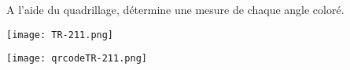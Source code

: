 
A l'aide du quadrillage, détermine une mesure de chaque angle coloré. 

\begin{minipage}{0.48\linewidth}
\texttt{[image: TR-211.png]} 
\end{minipage}
\hfill
\begin{minipage}{0.48\linewidth}
\texttt{[image: qrcodeTR-211.png]}  
\end{minipage}